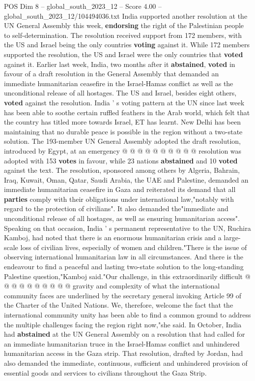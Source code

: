 \begin{textsample}{POS Dim 8 – global\_south\_2023\_12 – Score 4.00 – global\_south\_2023\_12/104494036.txt}  \label{ex:f8_pos_238}
India supported another resolution at the UN General Assembly this week, \textbf{endorsing} the right of the Palestinian people to self-determination.
The resolution received support from 172 members, with the US and Israel being the only countries \textbf{voting} against it.
While 172 members supported the resolution, the US and Israel were the only countries that \textbf{voted} against it.
Earlier last week, India, two months after it \textbf{abstained}, \textbf{voted} in favour of a draft resolution in the General Assembly that demanded an immediate humanitarian ceasefire in the Israel-Hamas conflict as well as the unconditional release of all hostages.
The US and Israel, besides eight others, \textbf{voted} against the resolution.
India ' s voting pattern at the UN since last week has been able to soothe certain ruffled feathers in the Arab world, which felt that the country has titled more towards Israel, ET has learnt.
New Delhi has been maintaining that no durable peace is possible in the region without a two-state solution.
The 193-member UN General Assembly adopted the draft resolution, introduced by Egypt, at an emergency @ @ @ @ @ @ @ @ @ @ resolution was adopted with 153 \textbf{votes} in favour, while 23 nations \textbf{abstained} and 10 \textbf{voted} against the text.
The resolution, sponsored among others by Algeria, Bahrain, Iraq, Kuwait, Oman, Qatar, Saudi Arabia, the UAE and Palestine, demanded an immediate humanitarian ceasefire in Gaza and reiterated its demand that all \textbf{parties} comply with their obligations under international law,"notably with regard to the protection of civilians".
It also demanded the"immediate and unconditional release of all hostages, as well as ensuring humanitarian access".
Speaking on that occasion, India ' s permanent representative to the UN, Ruchira Kamboj, had noted that there is an enormous humanitarian crisis and a large-scale loss of civilian lives, especially of women and children."There is the issue of observing international humanitarian law in all circumstances.
And there is the endeavour to find a peaceful and lasting two-state solution to the long-standing Palestine question,"Kamboj said."Our challenge, in this extraordinarily difficult @ @ @ @ @ @ @ @ @ @ gravity and complexity of what the international community faces are underlined by the secretary general invoking Article 99 of the Charter of the United Nations.
We, therefore, welcome the fact that the international community unity has been able to find a common ground to address the multiple challenges facing the region right now,"she said.
In October, India had \textbf{abstained} at the UN General Assembly on a resolution that had called for an immediate humanitarian truce in the Israel-Hamas conflict and unhindered humanitarian access in the Gaza strip.
That resolution, drafted by Jordan, had also demanded the immediate, continuous, sufficient and unhindered provision of essential goods and services to civilians throughout the Gaza Strip.

\end{textsample}
